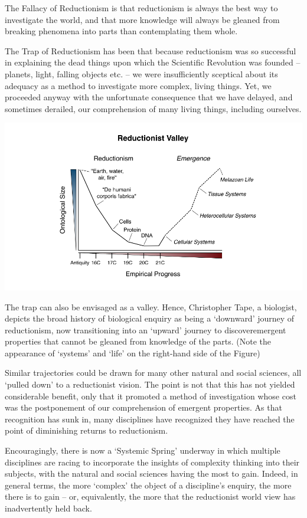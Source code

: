 \documentclass[
]{book}
\begin{document}
The Fallacy of Reductionism is that reductionism is always the best way to investigate the world, and that more knowledge will always be gleaned from breaking phenomena into parts than contemplating them whole.

The Trap of Reductionism has been that because reductionism was so successful in explaining the dead things upon which the Scientific Revolution was founded -- planets, light, falling objects etc. -- we were insufficiently sceptical about its adequacy as a method to investigate more complex, living things. Yet, we proceeded anyway with the unfortunate consequence that we have delayed, and sometimes derailed, our comprehension of many living things, including ourselves.

\includegraphics{fig/reductionist_avlley.png}

The trap can also be envisaged as a valley. Hence, Christopher Tape, a biologist, depicts the broad history of biological enquiry as being a `downward' journey of reductionism, now transitioning into an `upward' journey to discoveremergent properties that cannot be gleaned from knowledge of the parts.
(Note the appearance of `systems' and `life' on the right-hand side of the Figure)

Similar trajectories could be drawn for many other natural and social sciences, all `pulled down' to a reductionist vision. The point is not that this has not yielded considerable benefit, only that it promoted a method of investigation whose cost was the postponement of our comprehension of emergent properties. As that recognition has sunk in, many disciplines have recognized they have reached the point of diminishing returns to reductionism.

Encouragingly, there is now a `Systemic Spring' underway in which multiple disciplines are racing to incorporate the insights of complexity thinking into their subjects, with the natural and social sciences having the most to gain. Indeed, in general terms, the more `complex' the object of a discipline's enquiry, the more there is to gain -- or, equivalently, the more that the reductionist world view has inadvertently held back.
\end{document}
